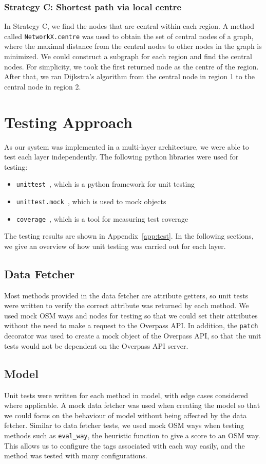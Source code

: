 \documentclass[12pt,a4paper]{report}
\begin{document}
\subsubsection*{Strategy C: Shortest path via local centre}
In Strategy C, we find the nodes that are central within each region. A method called \texttt{NetworkX.centre} was used to obtain the set of central nodes of a graph, where the maximal distance from the central nodes to other nodes in the graph is minimized. We could construct a subgraph for each region and find the central nodes. For simplicity, we took the first returned node as the centre of the region. After that, we ran Dijkstra's algorithm from the central node in region 1 to the central node in region 2.

\section{Testing Approach}
As our system was implemented in a multi-layer architecture, we were able to test each layer independently. The following python libraries were used for testing:
\begin{itemize}
    \item \texttt{unittest}~\cite{unittest}, which is a python framework for unit testing
    \item \texttt{unittest.mock}~\cite{unittest:mock}, which is used to mock objects
    \item \texttt{coverage}~\cite{coverage}, which is a tool for measuring test coverage
\end{itemize}

The testing results are shown in Appendix~\ref{app:test}. In the following sections, we give an overview of how unit testing was carried out for each layer.

\subsection{Data Fetcher}
Most methods provided in the data fetcher are attribute getters, so unit tests were written to verify the correct attribute was returned by each method. We used mock OSM ways and nodes for testing so that we could set their attributes without the need to make a request to the Overpass API. In addition, the \texttt{patch} decorator was used to create a mock object of the Overpass API, so that the unit tests would not be dependent on the Overpass API server.

\subsection{Model}
Unit tests were written for each method in model, with edge cases considered where applicable. A mock data fetcher was used when creating the model so that we could focus on the behaviour of model without being affected by the data fetcher. Similar to data fetcher tests, we used mock OSM ways when testing methods such as \texttt{eval\_way}, the heuristic function to give a score to an OSM way. This allows us to configure the tags associated with each way easily, and the method was tested with many configurations.
\end{document}
